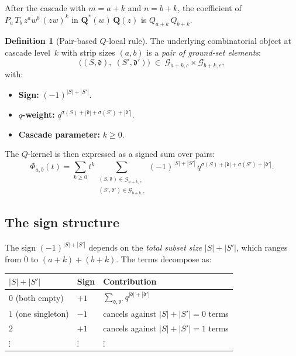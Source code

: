 \documentclass[11pt]{article}
\theoremstyle{plain}
\theoremstyle{definition}
\newtheorem{definition}[theorem]{Definition}
\begin{document}
After the cascade with $m = a + k$ and $n = b + k$, the coefficient
of $P_a\, T_b\, z^a w^b\, (zw)^k$ in
$\mathbf{Q}^*(w)\,\mathbf{Q}(z)$ is $Q_{a+k}\, Q_{b+k}$.

\begin{definition}[Pair-based $Q$-local rule]
\label{def:pair-rule}
The underlying combinatorial object at cascade level~$k$ with
strip sizes $(a,b)$ is a \emph{pair of ground-set elements}:
\begin{equation}\label{eq:pair}
  \bigl((S,\mathfrak{d}),\; (S',\mathfrak{d}')\bigr)
  \;\in\;
  \mathcal{G}_{a+k,c} \times \mathcal{G}_{b+k,c},
\end{equation}
with:
\begin{itemize}
  \item \textbf{Sign:}\; $(-1)^{|S|+|S'|}$.
  \item \textbf{$q$-weight:}\;
    $q^{\sigma(S) + |\mathfrak{d}|
      + \sigma(S') + |\mathfrak{d}'|}$.
  \item \textbf{Cascade parameter:}\; $k \geq 0$.
\end{itemize}
\end{definition}

The $Q$-kernel is then expressed as a signed sum over pairs:
\begin{equation}\label{eq:Phi-pairs}
  \Phi_{a,b}(t) = \sum_{k \geq 0} t^k
    \sum_{\substack{(S,\mathfrak{d}) \in \mathcal{G}_{a+k,c} \\
      (S',\mathfrak{d}') \in \mathcal{G}_{b+k,c}}}
    (-1)^{|S|+|S'|}\,
    q^{\sigma(S) + |\mathfrak{d}|
      + \sigma(S') + |\mathfrak{d}'|}.
\end{equation}


\subsection{The sign structure}

The sign $(-1)^{|S|+|S'|}$ depends on the \emph{total subset
size} $|S| + |S'|$, which ranges from $0$ to $(a+k) + (b+k)$.
The terms decompose as:

\begin{center}
\begin{tabular}{l|l|l}
$|S| + |S'|$ & \textbf{Sign} & \textbf{Contribution} \\ \hline
$0$ (both empty) & $+1$ &
  $\sum_{\mathfrak{d},\mathfrak{d}'}
  q^{|\mathfrak{d}| + |\mathfrak{d}'|}$ \\[3pt]
$1$ (one singleton) & $-1$ &
  cancels against $|S|+|S'| = 0$ terms \\[3pt]
$2$ & $+1$ &
  cancels against $|S|+|S'| = 1$ terms \\[3pt]
$\vdots$ & $\vdots$ & $\vdots$
\end{tabular}
\end{center}
\end{document}
